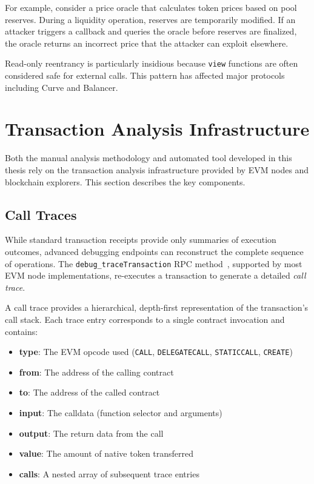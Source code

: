 For example, consider a price oracle that calculates token prices based on pool reserves. During a liquidity operation, reserves are temporarily modified. If an attacker triggers a callback and queries the oracle before reserves are finalized, the oracle returns an incorrect price that the attacker can exploit elsewhere.

Read-only reentrancy is particularly insidious because \lstinline{view} functions are often considered safe for external calls. This pattern has affected major protocols including Curve and Balancer.

\section{Transaction Analysis Infrastructure}
\label{sec:bg-infrastructure}

Both the manual analysis methodology and automated tool developed in this thesis rely on the transaction analysis infrastructure provided by EVM nodes and blockchain explorers. This section describes the key components.

\subsection{Call Traces}

While standard transaction receipts provide only summaries of execution outcomes, advanced debugging endpoints can reconstruct the complete sequence of operations. The \lstinline{debug_traceTransaction} RPC method~\cite{geth-debug-namespace}, supported by most EVM node implementations, re-executes a transaction to generate a detailed \textit{call trace}.

A call trace provides a hierarchical, depth-first representation of the transaction's call stack. Each trace entry corresponds to a single contract invocation and contains:
\begin{itemize}
    \item \textbf{type}: The EVM opcode used (\eg \texttt{CALL}, \texttt{DELEGATECALL}, \texttt{STATICCALL}, \texttt{CREATE})
    \item \textbf{from}: The address of the calling contract
    \item \textbf{to}: The address of the called contract
    \item \textbf{input}: The calldata (function selector and arguments)
    \item \textbf{output}: The return data from the call
    \item \textbf{value}: The amount of native token transferred
    \item \textbf{calls}: A nested array of subsequent trace entries
\end{itemize}

